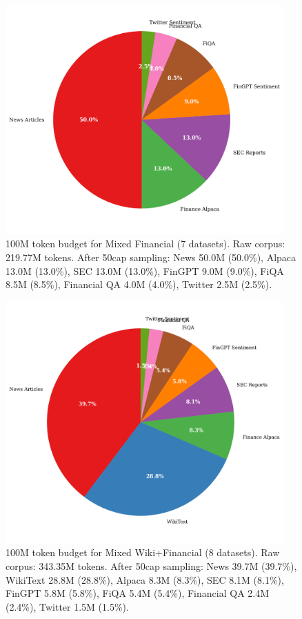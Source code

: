 \begin{figure}[htbp]
\centering
\includegraphics[width=0.95\textwidth]{figures/diagram_50cap.png}
\caption[Mixed Financial Token Budget]{100M token budget for Mixed Financial (7 datasets). Raw corpus: 219.77M tokens. After 50cap sampling: News 50.0M (50.0\%), Alpaca 13.0M (13.0\%), SEC 13.0M (13.0\%), FinGPT 9.0M (9.0\%), FiQA 8.5M (8.5\%), Financial QA 4.0M (4.0\%), Twitter 2.5M (2.5\%).}
\label{fig:diagram_50cap}
\end{figure}

\begin{figure}[htbp]
\centering
\includegraphics[width=0.95\textwidth]{figures/diagram_mixed_wiki.png}
\caption[Mixed Wiki+Financial Token Budget]{100M token budget for Mixed Wiki+Financial (8 datasets). Raw corpus: 343.35M tokens. After 50cap sampling: News 39.7M (39.7\%), WikiText 28.8M (28.8\%), Alpaca 8.3M (8.3\%), SEC 8.1M (8.1\%), FinGPT 5.8M (5.8\%), FiQA 5.4M (5.4\%), Financial QA 2.4M (2.4\%), Twitter 1.5M (1.5\%).}
\label{fig:diagram_mixed_wiki}
\end{figure}

